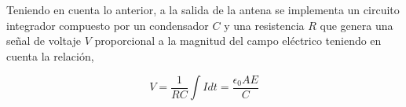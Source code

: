 \documentclass[12pt,a4paper,oneside]{book}
\begin{document}
Teniendo en cuenta lo anterior, a la salida de la antena se implementa un circuito integrador compuesto por un condensador $C$ y una resistencia $R$ que genera una señal de voltaje $V$ proporcional a la magnitud del campo eléctrico teniendo en cuenta la relación,

\begin{equation}
    V = \frac{1}{RC} \int I dt = \frac{\epsilon_0 A E}{C}
\end{equation}




\newpage
 
\end{document}
